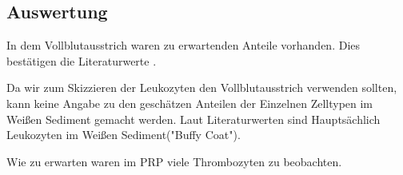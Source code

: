\subsection{Auswertung}
\label{sec:Blut-A}

In dem Vollblutausstrich waren zu erwartenden Anteile vorhanden.
Dies bestätigen die Literaturwerte .
\cite{Antwerpes2018}

Da wir zum Skizzieren der Leukozyten den Vollblutausstrich verwenden sollten, kann keine Angabe zu den geschätzen Anteilen der Einzelnen Zelltypen im Weißen Sediment gemacht werden.
Laut Literaturwerten sind Hauptsächlich Leukozyten im Weißen Sediment("Buffy Coat").


Wie zu erwarten waren im PRP viele Thrombozyten zu beobachten.



%